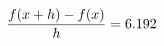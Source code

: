 \documentclass[preview]{standalone}
\begin{document}
\begin{align*}
\special{dvisvgm:raw <g id='unique000'>}\frac{f(x+h)-f(x)}{h} = 6.192\special{dvisvgm:raw </g>}
\end{align*}
\end{document}
